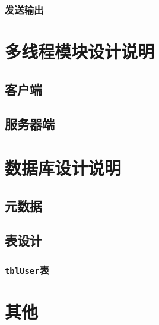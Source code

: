 \documentclass{article}
\begin{document}
\subsubsection{发送输出}


\section{多线程模块设计说明}
\subsection{客户端}
\subsection{服务器端}


\section{数据库设计说明}
\subsection{元数据}
\subsection{表设计}
\subsubsection{\texttt{tblUser}表}


\section{其他}
\end{document}
